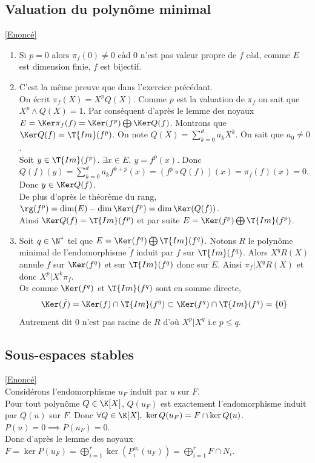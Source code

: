 \documentclass[8pt]{book}
\begin{document}
	\subsection{Valuation du polynôme minimal }
	\label{Valuation du polynôme minimal corrigé}
	\textcolor{blue}{\hyperref[Valuation du polynôme minimal]{[Enoncé]}}\\
	\begin{enumerate}
		\item Si $p=0$ alors $\pi_f(0)\ne 0$ càd $0$ n'est pas valeur propre de $f$ càd, comme $E$ est dimension finie, $f$ est bijectif.
		\item C'est la même preuve que dans l'exercice précédant.\\
		On écrit $\pi_f(X)=X^pQ(X)$. Comme $p$ est la valuation de $\pi_f$ on sait que $X^p\wedge Q(X)=1$. Par conséquent d'après le lemme des noyaux $E=\Ker \pi_f(f)=\Ker(f^p)\bigoplus\Ker Q(f)$. Montrons que $\Ker Q(f)=\T{Im}(f^p)$. On note $Q(X)=\displaystyle\sum_{k=0}^da_kX^k$. On sait que $a_0\ne 0$.\\
		Soit $y\in \T{Im}(f^p)$. $\exists x\in E,\ y=f^p(x)$. Donc $Q(f)(y)=\displaystyle\sum_{k=0}^da_kf^{k+p}(x)=(f^p\circ Q(f))(x)=\pi_f(f)(x)=0$. Donc $y\in \Ker Q(f)$.\\
		De plus d'après le théorème du rang, $\rg(f^p)=\dim(E)-\dim\Ker(f^p)=\dim\Ker(Q(f))$.\\
		Ainsi $\Ker Q(f)=\T{Im}(f^p)$ et par suite $E=\Ker(f^p)\bigoplus\T{Im}(f^p)$.
		\item Soit $q\in \N^*$ tel que $E=\Ker(f^q)\bigoplus\T{Im}(f^q)$. Notons $R$ le polynôme minimal de l'endomorphisme $\tilde f$ induit par $f$ sur $\T{Im}(f^q)$. Alors $X^qR(X)$ annule $f$ sur $\Ker(f^q)$ et sur $\T{Im}(f^q)$ donc sur $E$. Ainsi $\pi_f|X^qR(X)$ et donc $X^p|X^k\pi_f$.\\
		Or comme $\Ker(f^q)$ et $\T{Im}(f^q)$ sont en somme directe,
		$$\Ker(\tilde f)=\Ker(f)\cap\T{Im}(f^q)\subset \Ker(f^q)\cap\T{Im}(f^q)=\{0\}$$
		Autrement dit $0$ n'est pas racine de $R$ d'où $X^p|X^q$ i.e $p\leq q$.
	\end{enumerate}
	
	\subsection{Sous-espaces stables }
	\label{Sous-espaces stables corrigé}
	\textcolor{blue}{\hyperref[Sous-espaces stables]{[Enoncé]}}\\
	Considérons l'endomorphisme $u_F$ induit par $u$ sur $F$.\\
	Pour tout polynôme $Q\in \K[X]$, $Q(u_F)$ est exactement l'endomorphisme induit par $Q(u)$ sur $F$. Donc $\forall Q\in \K[X],\ \ker Q(u_F)=F\cap \ker Q(u)$.\\
	$P(u)=0\implies P(u_F)=0$.\\
	Donc d'après le lemme des noyaux $F=\ker P(u_F)=\displaystyle\bigoplus_{i=1}^r\ker(P_i^{\alpha_i}(u_F))=\bigoplus_{i=1}^r F\cap N_i$.
	
\end{document}
